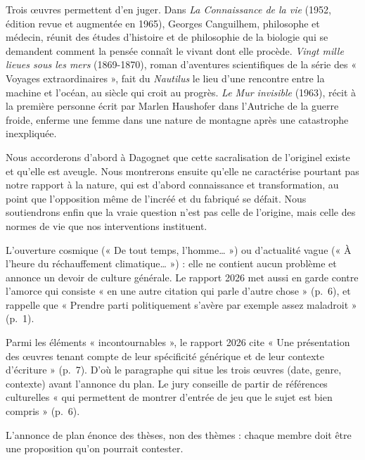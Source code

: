 \documentclass[11pt,a4paper]{article}
\begin{document}
Trois œuvres permettent d'en juger. Dans \emph{La Connaissance de la vie} (1952, édition revue et augmentée en 1965), Georges Canguilhem, philosophe et médecin, réunit des études d'histoire et de philosophie de la biologie qui se demandent comment la pensée connaît le vivant dont elle procède. \emph{Vingt mille lieues sous les mers} (1869-1870), roman d'aventures scientifiques de la série des « Voyages extraordinaires », fait du \emph{Nautilus} le lieu d'une rencontre entre la machine et l'océan, au siècle qui croit au progrès. \emph{Le Mur invisible} (1963), récit à la première personne écrit par Marlen Haushofer dans l'Autriche de la guerre froide, enferme une femme dans une nature de montagne après une catastrophe inexpliquée.

Nous accorderons d'abord à Dagognet que cette sacralisation de l'originel existe et qu'elle est aveugle. Nous montrerons ensuite qu'elle ne caractérise pourtant pas notre rapport à la nature, qui est d'abord connaissance et transformation, au point que l'opposition même de l'incréé et du fabriqué se défait. Nous soutiendrons enfin que la vraie question n'est pas celle de l'origine, mais celle des normes de vie que nos interventions instituent.

\begin{piege}

L'ouverture cosmique (« De tout temps, l'homme\ldots{} ») ou d'actualité vague (« À l'heure du réchauffement climatique\ldots{} ») : elle ne contient aucun problème et annonce un devoir de culture générale. Le rapport 2026 met aussi en garde contre l'amorce qui consiste « en une autre citation qui parle d'autre chose » (p.~6), et rappelle que « Prendre parti politiquement s'avère par exemple assez maladroit » (p.~1).

\end{piege}

\begin{jury}

Parmi les éléments « incontournables », le rapport 2026 cite « Une présentation des œuvres tenant compte de leur spécificité générique et de leur contexte d'écriture » (p.~7). D'où le paragraphe qui situe les trois œuvres (date, genre, contexte) avant l'annonce du plan. Le jury conseille de partir de références culturelles « qui permettent de montrer d'entrée de jeu que le sujet est bien compris » (p.~6).

\end{jury}

\begin{methode}

L'annonce de plan énonce des thèses, non des thèmes : chaque membre doit être une proposition qu'on pourrait contester.

\end{methode}
\end{document}
